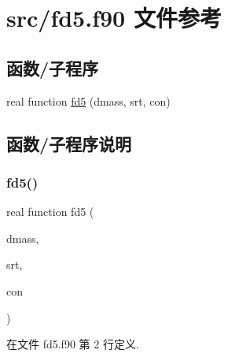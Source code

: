 \hypertarget{fd5_8f90}{}\section{src/fd5.f90 文件参考}
\label{fd5_8f90}
\subsection*{函数/子程序}
\begin{DoxyCompactItemize}
\item 
real function \mbox{\hyperlink{fd5_8f90_a192eba44f1e1ab491b44142f9507b391}{fd5}} (dmass, srt, con)
\end{DoxyCompactItemize}


\subsection{函数/子程序说明}
\mbox{\label{fd5_8f90_a192eba44f1e1ab491b44142f9507b391}} 
\subsubsection{\texorpdfstring{fd5()}{fd5()}}
{\footnotesize\ttfamily real function fd5 (\begin{DoxyParamCaption}\item[{}]{dmass,  }\item[{}]{srt,  }\item[{}]{con }\end{DoxyParamCaption})}



在文件 fd5.\+f90 第 2 行定义.

